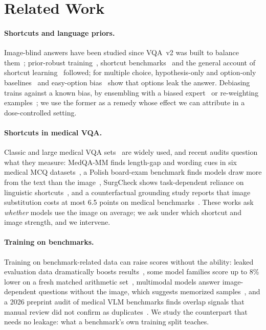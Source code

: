 \section{Related Work}
\label{sec:related}

\paragraph{Shortcuts and language priors.}
Image-blind answers have been studied since VQA~v2 was built to balance them~\cite{goyal2017making}; prior-robust training~\cite{agrawal2018dont}, shortcut benchmarks~\cite{si2022language} and the general account of shortcut learning~\cite{geirhos2020shortcut} followed; for multiple choice, hypothesis-only and option-only baselines~\cite{poliak2018hypothesis,gururangan2018annotation} and easy-option bias~\cite{zhang2025easyoption} show that options leak the answer.
Debiasing trains against a known bias, by ensembling with a biased expert~\cite{clark2019dont} or re-weighting examples~\cite{cadene2019rubi}; we use the former as a remedy whose effect we can attribute in a dose-controlled setting.

\paragraph{Shortcuts in medical VQA.}
Classic and large medical VQA sets~\cite{lau2018vqarad,liu2021slake,he2020pathvqa,zhang2023pmcvqa,hu2024omnimedvqa} are widely used, and recent audits question what they measure: MedQA-MM finds length-gap and wording cues in six medical MCQ datasets~\cite{wang2026medqamm}, a Polish board-exam benchmark finds models draw more from the text than the image~\cite{pokrywka2026polish}, SurgCheck shows task-dependent reliance on linguistic shortcuts~\cite{shin2026surgcheck}, and a counterfactual grounding study reports that image substitution costs at most 6.5 points on medical benchmarks~\cite{zafar2026coral}.
These works ask \emph{whether} models use the image on average; we ask under which shortcut and image strength, and we intervene.

\paragraph{Training on benchmarks.}
Training on benchmark-related data can raise scores without the ability: leaked evaluation data dramatically boosts results~\cite{zhou2023cheater}, some model families score up to 8\% lower on a fresh matched arithmetic set~\cite{zhang2024gsm1k}, multimodal models answer image-dependent questions without the image, which suggests memorized samples~\cite{chen2024mmstar}, and a 2026 preprint audit of medical VLM benchmarks finds overlap signals that manual review did not confirm as duplicates~\cite{xu2026medvlmaudit}.
We study the counterpart that needs no leakage: what a benchmark's own training split teaches.


